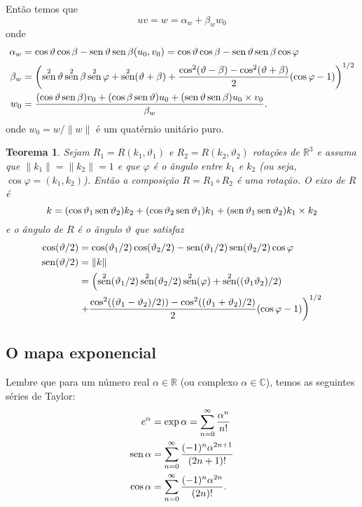 \documentclass[12pt]{amsart}
\newcommand{\C}{\mathbb C}
\newcommand{\R}{\mathbb R}
\DeclareMathOperator{\sen}{\textrm{\rm sen}}
\newtheorem{theorem}{Teorema}
\theoremstyle{definition}
\begin{document}
Então temos que 
\[
    uv=w=\alpha_w+\beta_ww_0
\]
onde
\begin{align*}
    \alpha_w&= \cos\vartheta\cos\beta-\sen\vartheta\sen\beta(u_0,v_0)=\cos\vartheta\cos\beta-\sen\vartheta\sen\beta\cos\varphi\\
    \beta_w&=\left(\sen^2\vartheta\sen^2\beta\sen^2\varphi+\sen^2(\vartheta+\beta)+\frac{\cos^2(\vartheta-\beta)-\cos^2(\vartheta+\beta)}{2}(\cos\varphi-1)\right)^{1/2}\\
    w_0&=\frac{(\cos\vartheta\sen\beta) v_0+(\cos\beta\sen\vartheta) u_0+(\sen\vartheta\sen\beta)u_0\times v_0}{\beta_w}.
\end{align*} 
onde $w_0=w/\|w\|$ é um quatérnio unitário puro.

\begin{theorem}
    Sejam $R_1=R(k_1,\vartheta_1)$ e $R_2=R(k_2,\vartheta_2)$ rotações de $\R^3$ e assuma que 
    $\|k_1\|=\|k_2\|=1$ e que $\varphi$ é o ângulo entre $k_1$ e $k_2$ (ou seja, $\cos\varphi=(k_1,k_2)$). Então a composição 
    $R=R_1\circ R_2$ é uma rotação. O eixo de $R$ é
    \[
        k=(\cos\vartheta_1\sen\vartheta_2) k_2+(\cos\vartheta_2\sen\vartheta_1) k_1+
        (\sen\vartheta_1\sen\vartheta_2)k_1\times k_2
    \] 
    e o ângulo de $R$ é o ângulo $\vartheta$ que satisfaz 
    \begin{align*}
        \cos(\vartheta/2)&=\cos(\vartheta_1/2)\cos(\vartheta_2/2)-\sen(\vartheta_1/2)\sen(\vartheta_2/2)\cos\varphi\\
        \sen(\vartheta/2)&=\|k\|\\&=\left(\sen^2(\vartheta_1/2)\sen^2(\vartheta_2/2)\sen^2(\varphi)+\sen^2((\vartheta_1\vartheta_2)/2)\right.\\
        &\left.+\frac{\cos^2((\vartheta_1-\vartheta_2)/2))-\cos^2((\vartheta_1+\vartheta_2)/2)}{2}(\cos\varphi-1)\right)^{1/2}
    \end{align*}
\end{theorem}

\subsection{O mapa exponencial}

Lembre que para um número real $\alpha\in\R$ (ou complexo $\alpha\in\C$), temos as seguintes séries de Taylor:  
\begin{align*}
    e^\alpha &= \exp\alpha=\sum_{n=0}^\infty \frac{\alpha^n}{n!}\\
    \sen\alpha&=\sum_{n=0}^\infty\frac{(-1)^n\alpha^{2n+1}}{(2n+1)!}\\
    \cos\alpha&=\sum_{n=0}^\infty\frac{(-1)^n\alpha^{2n}}{(2n)!}.\\
\end{align*}
\end{document}
